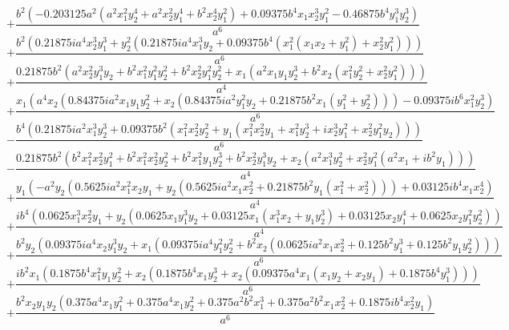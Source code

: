 $$+\frac{b^{2} \left(- 0.203125 a^{2} \left(a^{2} x_{1}^{2} y_{2}^{4} + a^{2} x_{2}^{2} y_{1}^{4} + b^{2} x_{2}^{4} y_{1}^{2}\right) + 0.09375 b^{4} x_{1} x_{2}^{3} y_{1}^{2} - 0.46875 b^{4} y_{1}^{3} y_{2}^{3}\right)}{a^{6}}$$
$$+\frac{b^{2} \left(0.21875 i a^{4} x_{2}^{3} y_{1}^{3} + y_{2}^{2} \left(0.21875 i a^{4} x_{1}^{3} y_{2} + 0.09375 b^{4} \left(x_{1}^{2} \left(x_{1} x_{2} + y_{1}^{2}\right) + x_{2}^{2} y_{1}^{2}\right)\right)\right)}{a^{6}}$$
$$+\frac{0.21875 b^{2} \left(a^{2} x_{2}^{2} y_{1}^{3} y_{2} + b^{2} x_{1}^{2} y_{1}^{2} y_{2}^{2} + b^{2} x_{2}^{2} y_{1}^{2} y_{2}^{2} + x_{1} \left(a^{2} x_{1} y_{1} y_{2}^{3} + b^{2} x_{2} \left(x_{1}^{2} y_{2}^{2} + x_{2}^{2} y_{1}^{2}\right)\right)\right)}{a^{4}}$$
$$+\frac{x_{1} \left(a^{4} x_{2} \left(0.84375 i a^{2} x_{1} y_{1} y_{2}^{2} + x_{2} \left(0.84375 i a^{2} y_{1}^{2} y_{2} + 0.21875 b^{2} x_{1} \left(y_{1}^{2} + y_{2}^{2}\right)\right)\right) - 0.09375 i b^{6} x_{1}^{2} y_{2}^{3}\right)}{a^{6}}$$
$$- \frac{b^{4} \left(0.21875 i a^{2} x_{1}^{3} y_{2}^{3} + 0.09375 b^{2} \left(x_{1}^{2} x_{2}^{2} y_{2}^{2} + y_{1} \left(x_{1}^{2} x_{2}^{2} y_{1} + x_{1}^{2} y_{2}^{3} + i x_{2}^{3} y_{1}^{2} + x_{2}^{2} y_{1}^{2} y_{2}\right)\right)\right)}{a^{6}}$$
$$- \frac{0.21875 b^{2} \left(b^{2} x_{1}^{2} x_{2}^{2} y_{1}^{2} + b^{2} x_{1}^{2} x_{2}^{2} y_{2}^{2} + b^{2} x_{1}^{2} y_{1} y_{2}^{3} + b^{2} x_{2}^{2} y_{1}^{3} y_{2} + x_{2} \left(a^{2} x_{1}^{3} y_{2}^{2} + x_{2}^{2} y_{1}^{2} \left(a^{2} x_{1} + i b^{2} y_{1}\right)\right)\right)}{a^{4}}$$
$$+\frac{y_{1} \left(- a^{2} y_{2} \left(0.5625 i a^{2} x_{1}^{2} x_{2} y_{1} + y_{2} \left(0.5625 i a^{2} x_{1} x_{2}^{2} + 0.21875 b^{2} y_{1} \left(x_{1}^{2} + x_{2}^{2}\right)\right)\right) + 0.03125 i b^{4} x_{1} x_{2}^{4}\right)}{a^{4}}$$
$$+\frac{i b^{4} \left(0.0625 x_{1}^{3} x_{2}^{2} y_{1} + y_{2} \left(0.0625 x_{1} y_{1}^{3} y_{2} + 0.03125 x_{1} \left(x_{1}^{3} x_{2} + y_{1} y_{2}^{3}\right) + 0.03125 x_{2} y_{1}^{4} + 0.0625 x_{2} y_{1}^{2} y_{2}^{2}\right)\right)}{a^{4}}$$
$$+\frac{b^{2} y_{2} \left(0.09375 i a^{4} x_{2} y_{1}^{3} y_{2} + x_{1} \left(0.09375 i a^{4} y_{1}^{2} y_{2}^{2} + b^{2} x_{2} \left(0.0625 i a^{2} x_{1} x_{2}^{2} + 0.125 b^{2} y_{1}^{3} + 0.125 b^{2} y_{1} y_{2}^{2}\right)\right)\right)}{a^{6}}$$
$$+\frac{i b^{2} x_{1} \left(0.1875 b^{4} x_{1}^{2} y_{1} y_{2}^{2} + x_{2} \left(0.1875 b^{4} x_{1} y_{2}^{3} + x_{2} \left(0.09375 a^{4} x_{1} \left(x_{1} y_{2} + x_{2} y_{1}\right) + 0.1875 b^{4} y_{1}^{3}\right)\right)\right)}{a^{6}}$$
$$+\frac{b^{2} x_{2} y_{1} y_{2} \left(0.375 a^{4} x_{1} y_{1}^{2} + 0.375 a^{4} x_{1} y_{2}^{2} + 0.375 a^{2} b^{2} x_{1}^{3} + 0.375 a^{2} b^{2} x_{1} x_{2}^{2} + 0.1875 i b^{4} x_{2}^{2} y_{1}\right)}{a^{6}}$$
